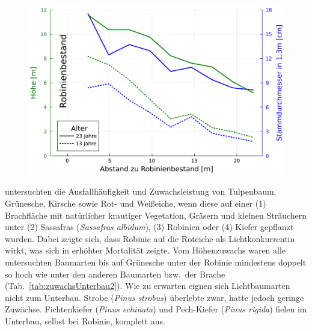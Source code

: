 \documentclass[twocolumn]{scrartcl}
\begin{document}
\begin{figure}[htbp]
  \centering
  \includegraphics[width=.9\linewidth]{./bild/bestandesrand}
  \label{fig:bestandesrand}
\end{figure}

\citet{chapman1951robinieSchirm} untersuchten die Ausfallhäufigkeit
und Zuwachsleistung von Tulpenbaum, Grünesche, Kirsche sowie Rot- und
Weißeiche, wenn diese auf einer (1) Brachfläche mit natürlicher
krautiger Vegetation, Gräsern und kleinen Sträuchern unter (2)
Sassafras (\emph{Sassafras albidum}), (3) Robinien oder (4) Kiefer
gepflanzt wurden. Dabei zeigte sich, dass Robinie auf die Roteiche als
Lichtkonkurrentin wirkt, was sich in erhöhter Mortalität zeigte. Vom
Höhenzuwachs waren alle untersuchten Baumarten bis auf Grünesche unter
der Robinie mindestens doppelt so hoch wie unter den anderen Baumarten
bzw.\ der Brache (Tab.~\ref{tab:zuwachsUnterbau2}). Wie zu erwarten
eignen sich Lichtbaumarten nicht zum Unterbau. Strobe (\emph{Pinus
strobus}) überlebte zwar, hatte jedoch geringe Zuwächse. Fichtenkiefer
(\emph{Pinus echinata}) und Pech-Kiefer (\emph{Pinus rigida}) fielen
im Unterbau, selbst bei Robinie, komplett aus.
\end{document}
